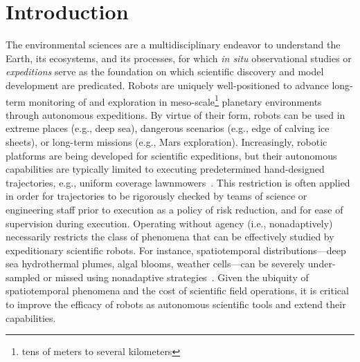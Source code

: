 \chapter{Introduction}


The environmental sciences are a multidisciplinary endeavor to understand the Earth, its ecosystems, and its processes, for which \emph{in situ} observational studies or \emph{expeditions} serve as the foundation on which scientific discovery and model development are predicated.
Robots are uniquely well-positioned to advance long-term monitoring of and exploration in meso-scale\footnote{tens of meters to several kilometers} planetary environments through autonomous expeditions.
By virtue of their form, robots can be used in extreme places (e.g., deep sea), dangerous scenarios (e.g., edge of calving ice sheets), or long-term missions (e.g., Mars exploration). Increasingly, robotic platforms are being developed for scientific expeditions, but their autonomous capabilities are typically limited to executing predetermined hand-designed trajectories, e.g., uniform coverage lawnmowers~\autocite{camilli2010tracking}.
This restriction is often applied in order for trajectories to be rigorously checked by teams of science or engineering staff prior to execution as a policy of risk reduction, and for ease of supervision during execution.
Operating without agency (i.e., nonadaptively) necessarily restricts the class of phenomena that can be effectively studied by expeditionary scientific robots.
For instance, spatiotemporal distributions---deep sea hydrothermal plumes, algal blooms, weather cells---can be severely under-sampled or missed using nonadaptive strategies~\autocite{flaspohler2019information}.
Given the ubiquity of spatiotemporal phenomena and the cost of scientific field operations, it is critical to improve the efficacy of robots as autonomous scientific tools and extend their capabilities.

